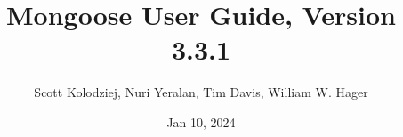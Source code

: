 \title{Mongoose User Guide, Version 3.3.1}
\author{Scott Kolodziej, Nuri Yeralan, Tim Davis, William W. Hager}
\date{Jan 10, 2024}
